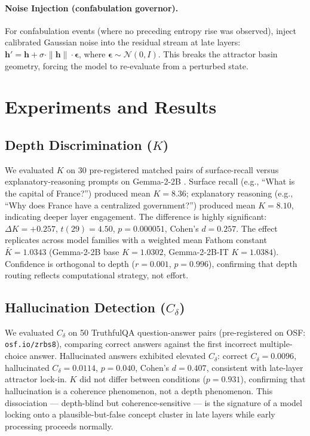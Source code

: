\documentclass{article}
\begin{document}
\paragraph{Noise Injection (confabulation governor).} For confabulation events (where no preceding entropy rise was observed), inject calibrated Gaussian noise into the residual stream at late layers: $\mathbf{h}' = \mathbf{h} + \sigma \cdot \|\mathbf{h}\| \cdot \boldsymbol{\epsilon}$, where $\boldsymbol{\epsilon} \sim \mathcal{N}(0, I)$. This breaks the attractor basin geometry, forcing the model to re-evaluate from a perturbed state.

\section{Experiments and Results}

\subsection{Depth Discrimination ($K$)}

We evaluated $K$ on 30 pre-registered matched pairs of surface-recall versus explanatory-reasoning prompts on Gemma-2-2B \citep{rodabaugh2026fathom}. Surface recall (e.g., ``What is the capital of France?'') produced mean $K = 8.36$; explanatory reasoning (e.g., ``Why does France have a centralized government?'') produced mean $K = 8.10$, indicating deeper layer engagement. The difference is highly significant: $\Delta K = +0.257$, $t(29) = 4.50$, $p = 0.000051$, Cohen's $d = 0.257$. The effect replicates across model families with a weighted mean Fathom constant $\bar{K} = 1.0343$ (Gemma-2-2B base $K = 1.0302$, Gemma-2-2B-IT $K = 1.0384$). Confidence is orthogonal to depth ($r = 0.001$, $p = 0.996$), confirming that depth routing reflects computational strategy, not effort.

\subsection{Hallucination Detection ($C_\delta$)}

We evaluated $C_\delta$ on 50 TruthfulQA question-answer pairs (pre-registered on OSF: \texttt{osf.io/zrbs8}), comparing correct answers against the first incorrect multiple-choice answer. Hallucinated answers exhibited elevated $C_\delta$: correct $C_\delta = 0.0096$, hallucinated $C_\delta = 0.0114$, $p = 0.040$, Cohen's $d = 0.407$, consistent with late-layer attractor lock-in. $K$ did not differ between conditions ($p = 0.931$), confirming that hallucination is a coherence phenomenon, not a depth phenomenon. This dissociation --- depth-blind but coherence-sensitive --- is the signature of a model locking onto a plausible-but-false concept cluster in late layers while early processing proceeds normally.
\end{document}
